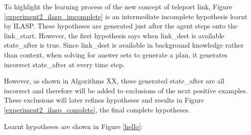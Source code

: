
To highlight the learning process of the new concept of teleport link, Figure \ref{experiment2_ilasp_imcomplete} is an intermediate incomplete hypothesis learnt by ILASP.
These hypotheses are generated just after the agent steps onto the \textsf{link\_start}. However, the first hypothesis says
when link\_dest is available state\_after is true. Since link\_dest is available in background knowledge rather than context,
when solving for answer sets to generate a plan, it generates incorrect state\_after at every time step.

However, as shown in Algorithms XX, these generated state\_after are all incorrect and therefore will be added to exclusions of the next positive examples.
These exclusions will later refines hypotheses and results in Figure \ref{experiment2_ilasp_complete}, the final complete hypotheses.

Learnt hypotheses are shown in Figure \ref{hello}:



